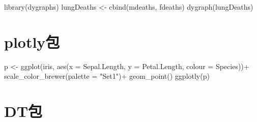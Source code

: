 \documentclass[
]{book}
\newenvironment{Shaded}{\begin{snugshade}}{\end{snugshade}}
\newcommand{\AttributeTok}[1]{\textcolor[rgb]{0.77,0.63,0.00}{#1}}
\newcommand{\FunctionTok}[1]{\textcolor[rgb]{0.00,0.00,0.00}{#1}}
\newcommand{\NormalTok}[1]{#1}
\newcommand{\OtherTok}[1]{\textcolor[rgb]{0.56,0.35,0.01}{#1}}
\newcommand{\SpecialCharTok}[1]{\textcolor[rgb]{0.00,0.00,0.00}{#1}}
\newcommand{\StringTok}[1]{\textcolor[rgb]{0.31,0.60,0.02}{#1}}
\begin{document}
\begin{Shaded}
\begin{Highlighting}[]
\FunctionTok{library}\NormalTok{(dygraphs)}
\NormalTok{lungDeaths }\OtherTok{\textless{}{-}} \FunctionTok{cbind}\NormalTok{(mdeaths, fdeaths)}
\FunctionTok{dygraph}\NormalTok{(lungDeaths)}
\end{Highlighting}
\end{Shaded}

\hypertarget{plotlyux5305}{%
\section{plotly包}\label{plotlyux5305}}

\begin{Shaded}
\end{Shaded}

\begin{Shaded}
\begin{Highlighting}[]
\NormalTok{p }\OtherTok{\textless{}{-}} \FunctionTok{ggplot}\NormalTok{(iris, }\FunctionTok{aes}\NormalTok{(}\AttributeTok{x =}\NormalTok{ Sepal.Length, }\AttributeTok{y =}\NormalTok{ Petal.Length, }\AttributeTok{colour =}\NormalTok{ Species))}\SpecialCharTok{+}
  \FunctionTok{scale\_color\_brewer}\NormalTok{(}\AttributeTok{palette =} \StringTok{"Set1"}\NormalTok{)}\SpecialCharTok{+}
  \FunctionTok{geom\_point}\NormalTok{()}
\FunctionTok{ggplotly}\NormalTok{(p)}
\end{Highlighting}
\end{Shaded}

\hypertarget{dtux5305}{%
\section{DT包}\label{dtux5305}}
\end{document}
